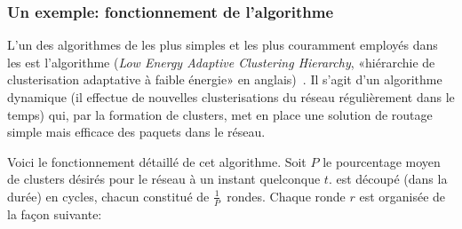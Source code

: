         \subsubsection{Un exemple: fonctionnement de l'algorithme \leach}\label{st:subsubsec:leach}
L'un des algorithmes de  les plus simples et les plus couramment employés dans les \rcsfs est l'algorithme \leach (\textit{Low Energy Adaptive Clustering Hierarchy}, \cad «hiérarchie de clusterisation adaptative à faible énergie» en anglais)~\cite{HCB00}.
Il s'agit d'un algorithme dynamique (il effectue de nouvelles clusterisations du réseau régulièrement dans le temps) qui, par la formation de clusters, met en place une solution de routage simple mais efficace des paquets dans le réseau.

Voici le fonctionnement détaillé de cet algorithme.
Soit $P$ le pourcentage moyen de clusters désirés pour le réseau à un instant quelconque $t$.
\leach est découpé (dans la durée) en cycles, chacun constitué de $\frac{1}{P}$~rondes.
Chaque ronde $r$ est organisée de la façon suivante:
